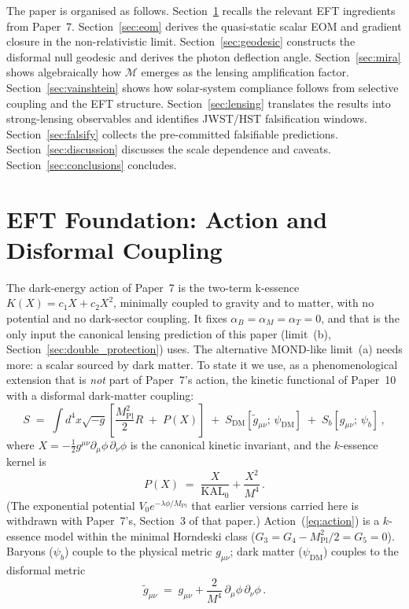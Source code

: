 \documentclass[12pt,a4paper]{article}
\newcommand{\KAL}{\mathrm{KAL}_0}
\newcommand{\MIRA}{\mathcal{M}}
\newcommand{\Mpl}{M_{\mathrm{Pl}}}
\newcommand{\half}{\tfrac{1}{2}}
\begin{document}
The paper is organised as follows.
Section~\ref{sec:eft} recalls the relevant EFT ingredients from Paper~7.
Section~\ref{sec:eom} derives the quasi-static scalar EOM and gradient
closure in the non-relativistic limit.
Section~\ref{sec:geodesic} constructs the disformal null geodesic and
derives the photon deflection angle.
Section~\ref{sec:mira} shows algebraically how $\MIRA$ emerges as the
lensing amplification factor.
Section~\ref{sec:vainshtein} shows how solar-system compliance follows
from selective coupling and the EFT structure.
Section~\ref{sec:lensing} translates the results into strong-lensing
observables and identifies JWST/HST falsification windows.
Section~\ref{sec:falsify} collects the pre-committed falsifiable
predictions.
Section~\ref{sec:discussion} discusses the scale dependence
and caveats.
Section~\ref{sec:conclusions} concludes.

\section{EFT Foundation: Action and Disformal Coupling}
\label{sec:eft}

The dark-energy action of Paper~7 \citep{ssee_paper7} is the two-term k-essence
$K(X)=c_1X+c_2X^2$, minimally coupled to gravity and to matter, with no potential
and no dark-sector coupling. It fixes $\alpha_B=\alpha_M=\alpha_T=0$, and that is
the only input the canonical lensing prediction of this paper (limit~(b),
Section~\ref{sec:double_protection}) uses. The alternative MOND-like limit~(a) needs
more: a scalar sourced by dark matter. To state it we use, as a phenomenological
extension that is \emph{not} part of Paper~7's action, the kinetic functional of
Paper~10 \citep{SSEE10} with a disformal dark-matter coupling:
\begin{equation}
  S \;=\; \int d^4x\sqrt{-g}\left[
      \frac{\Mpl^2}{2}R
      \;+\; P(X)
  \right]
  \;+\; S_{\mathrm{DM}}\!\left[\tilde{g}_{\mu\nu};\,\psi_{\mathrm{DM}}\right]
  \;+\; S_b[g_{\mu\nu};\,\psi_b]\,,
  \label{eq:action}
\end{equation}
where $X = -\half g^{\mu\nu}\partial_\mu\phi\,\partial_\nu\phi$ is the
canonical kinetic invariant, and the $k$-essence kernel is
\begin{equation}
  P(X) \;=\; \frac{X}{\KAL} + \frac{X^2}{M^4}\,.
  \label{eq:Pkernel}
\end{equation}
(The exponential potential $V_0e^{-\lambda\phi/\Mpl}$ that earlier versions carried
here is withdrawn with Paper~7's, Section~3 of that paper.)
Action~(\ref{eq:action}) is a $k$-essence model within the minimal
Horndeski class \citep{horndeski1974,Crisostomi2018} ($G_3=G_4-\Mpl^2/2=G_5=0$).
Baryons ($\psi_b$) couple to the physical metric $g_{\mu\nu}$; dark matter
($\psi_{\mathrm{DM}}$) couples to the disformal metric \citep{Bekenstein1993,Zumalacárregui2014}
\begin{equation}
  \tilde{g}_{\mu\nu} \;=\; g_{\mu\nu} + \frac{2}{M^4}\,\partial_\mu\phi\,\partial_\nu\phi\,.
  \label{eq:disformal}
\end{equation}
\end{document}
